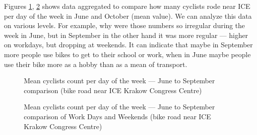 Figures \ref{fig:graph7}, \ref{fig:graph8} shows data aggregated to compare how many cyclists rode near ICE per day of the week in June and October (mean value). We can analyze this data on various levels. For example, why were those numbers so irregular during the week in June, but in September in the other hand it was more regular --- higher on workdays, but dropping at weekends. It can indicate that maybe in September more people use bikes to get to their school or work, when in June maybe people use their bike more as a hobby than as a mean of transport. 
\begin{figure}[H]
    \centering
    \caption{Mean cyclists count per day of the week --- June to September comparison (bike road near ICE Krakow Congress Centre)}
    \label{fig:graph7}
\end{figure}
\begin{figure}[H]
    \centering
    \caption{Mean cyclists count per day of the week --- June to September comparison of Work Days and Weekends (bike road near ICE Krakow Congress Centre)}
    \label{fig:graph8}
\end{figure}
